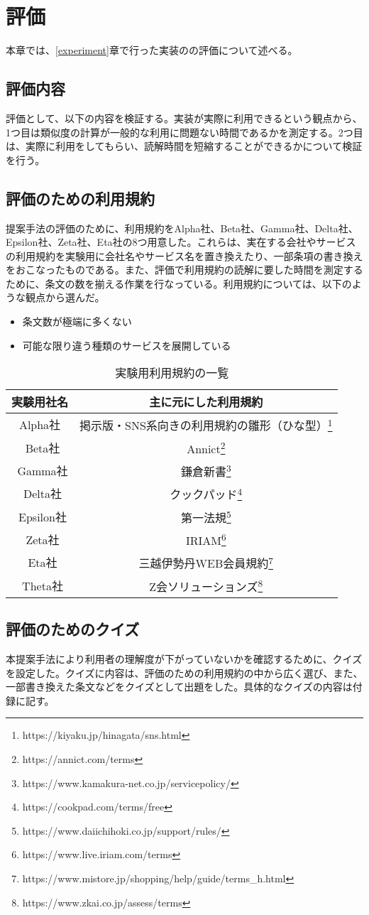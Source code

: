 \chapter{評価}
\label{discussion}
本章では、\ref{experiment}章で行った実装のの評価について述べる。

\section{評価内容}
評価として、以下の内容を検証する。実装が実際に利用できるという観点から、1つ目は類似度の計算が一般的な利用に問題ない時間であるかを測定する。2つ目は、実際に利用をしてもらい、読解時間を短縮することができるかについて検証を行う。

\section{評価のための利用規約}
提案手法の評価のために、利用規約をAlpha社、Beta社、Gamma社、Delta社、Epsilon社、Zeta社、Eta社の8つ用意した。これらは、実在する会社やサービスの利用規約を実験用に会社名やサービス名を置き換えたり、一部条項の書き換えをおこなったものである。また、評価で利用規約の読解に要した時間を測定するために、条文の数を揃える作業を行なっている。利用規約については、以下のような観点から選んだ。
\begin{itemize}
  \item 条文数が極端に多くない
  \item 可能な限り違う種類のサービスを展開している
\end{itemize}

\begin{table}[h]
  \centering
  \caption{実験用利用規約の一覧}
  \begin{tabular}{cc}
  \hline
  実験用社名    & 主に元にした利用規約\\ \hline\hline
  Alpha社   & 掲示版・SNS系向きの利用規約の雛形（ひな型）\footnote{https://kiyaku.jp/hinagata/sns.html}\\ \hline\
  Beta社    & Annict\footnote{https://annict.com/terms}\\ \hline\
  Gamma社   & 鎌倉新書\footnote{https://www.kamakura-net.co.jp/servicepolicy/}\\ \hline\
  Delta社   & クックパッド\footnote{https://cookpad.com/terms/free}\\ \hline\
  Epsilon社 & 第一法規\footnote{https://www.daiichihoki.co.jp/support/rules/}\\ \hline\
  Zeta社    & IRIAM\footnote{https://www.live.iriam.com/terms}\\ \hline\
  Eta社     & 三越伊勢丹WEB会員規約\footnote{https://www.mistore.jp/shopping/help/guide/terms\_h.html}\\ \hline\
  Theta社   & Z会ソリューションズ\footnote{https://www.zkai.co.jp/assess/terms}\\ \hline
  \end{tabular}
  \end{table}

\section{評価のためのクイズ}
本提案手法により利用者の理解度が下がっていないかを確認するために、クイズを設定した。クイズに内容は、評価のための利用規約の中から広く選び、また、一部書き換えた条文などをクイズとして出題をした。具体的なクイズの内容は付録に記す。

